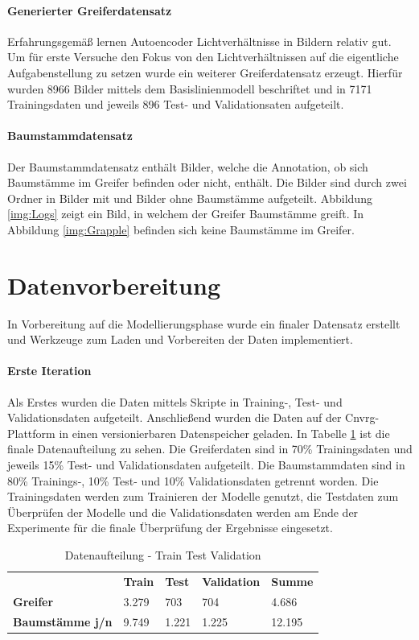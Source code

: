 	\paragraph{Generierter Greiferdatensatz} Erfahrungsgemäß lernen Autoencoder Lichtverhältnisse in Bildern relativ gut. Um für erste Versuche den Fokus von den Lichtverhältnissen auf die eigentliche Aufgabenstellung zu setzen wurde ein weiterer Greiferdatensatz erzeugt. Hierfür wurden 8966 Bilder mittels dem Basislinienmodell beschriftet und in 7171 Trainingsdaten und jeweils 896 Test- und Validationsaten aufgeteilt.
	 
	\paragraph{Baumstammdatensatz} Der Baumstammdatensatz enthält Bilder, welche die Annotation, ob sich Baumstämme im Greifer befinden oder nicht, enthält. Die Bilder sind durch zwei Ordner in Bilder mit und Bilder ohne Baumstämme aufgeteilt. Abbildung \ref{img:Logs} zeigt ein Bild, in welchem der Greifer Baumstämme greift. In Abbildung \ref{img:Grapple} befinden sich keine Baumstämme im Greifer.  
			
	\section{Datenvorbereitung}
	\label{sec:DataPreparation}
	In Vorbereitung auf die Modellierungsphase wurde ein finaler Datensatz erstellt und Werkzeuge zum Laden und Vorbereiten der Daten implementiert.
	\paragraph{Erste Iteration} Als Erstes wurden die Daten mittels Skripte in Training-, Test- und Validationsdaten aufgeteilt. Anschließend wurden die Daten auf der Cnvrg-Plattform in einen versionierbaren Datenspeicher geladen. In Tabelle \ref{table:DatenaufteilungTrainTestValidation} ist die finale Datenaufteilung zu sehen. Die Greiferdaten sind in 70\% Trainingsdaten und jeweils 15\% Test- und Validationsdaten aufgeteilt. Die Baumstammdaten sind in 80\% Trainings-, 10\% Test- und 10\% Validationsdaten getrennt worden. Die Trainingsdaten werden zum Trainieren der Modelle genutzt, die Testdaten zum Überprüfen der Modelle und die Validationsdaten werden am Ende der Experimente für die finale Überprüfung der Ergebnisse eingesetzt.
	\begin{table}[ht]
		\centering
		\begin{tabularx}{\textwidth}{lllll}
			& \textbf{Train} & \textbf{Test}  & \textbf{Validation} & \textbf{Summe} 	 \\
			\textbf{Greifer} 				 & 	3.279			& 703	 & 704				   & 4.686 	\\
			\textbf{Baumstämme j/n}	 	  &  9.749	   & 1.221 	& 1.225	& 12.195\\		
		\end{tabularx}
		\caption{Datenaufteilung - Train Test Validation}
		\label{table:DatenaufteilungTrainTestValidation}
	\end{table}
	
